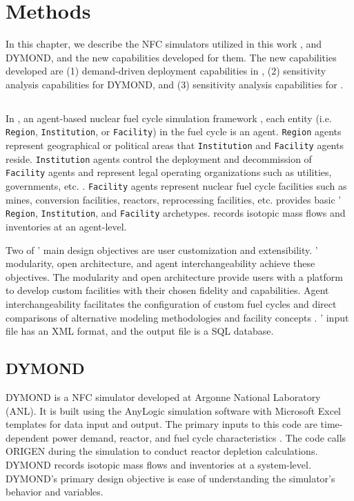 \chapter{Methods}
\label{chap:3}
In this chapter, we describe the \gls{NFC} simulators utilized in this work
, \Cyclus and DYMOND, and the new capabilities developed for them. 
The new capabilities developed are 
(1) demand-driven deployment capabilities in \Cyclus, 
(2) sensitivity analysis capabilities for DYMOND, and
(3) sensitivity analysis capabilities for \Cyclus. 

\section{\Cyclus}
In \Cyclus, an agent-based nuclear fuel cycle simulation framework 
\cite{huff_fundamental_2016}, 
each entity (i.e. \texttt{Region}, \texttt{Institution}, or \texttt{Facility}) in the 
fuel cycle is an agent. 
\texttt{Region} agents represent geographical or political areas 
that \texttt{Institution}
and \texttt{Facility} agents reside. 
\texttt{Institution} agents control the 
deployment and decommission of \texttt{Facility} agents 
and represent legal operating organizations such as
utilities, governments, etc. \cite{huff_fundamental_2016}.
\texttt{Facility} agents represent nuclear fuel cycle facilities
such as mines, conversion facilities, reactors, reprocessing facilities, 
etc. 
\Cycamore \cite{carlsen_cycamore_2014}
provides basic \Cyclus' \texttt{Region}, \texttt{Institution}, 
and \texttt{Facility} archetypes. 
\Cyclus records isotopic mass flows and inventories at an agent-level. 

Two of \Cyclus' main design objectives are user customization and 
extensibility. 
\Cyclus' modularity, open architecture, and agent interchangeability 
achieve these objectives.
The modularity and open architecture provide users with a 
platform to develop custom facilities with their chosen fidelity 
and capabilities. 
Agent interchangeability facilitates the configuration of custom fuel 
cycles and direct comparisons of alternative modeling methodologies 
and facility concepts \cite{huff_fundamental_2016}. 
\Cyclus' input file has an XML format, and the output file is 
a SQL database. 

\section{DYMOND}
DYMOND \cite{yacout_modeling_2005} is a \gls{NFC} simulator developed 
at Argonne National Laboratory (\gls{ANL}). 
It is built using the AnyLogic simulation software with 
Microsoft Excel templates for data input and output. 
The primary inputs to this code are time-dependent power demand, 
reactor, and fuel cycle characteristics 
\cite{feng_standardized_2016}.   
The code calls ORIGEN \cite{bell_origen_1973} during the simulation 
to conduct reactor depletion calculations. 
DYMOND records isotopic mass flows and inventories
at a system-level.
DYMOND's primary design objective is ease of understanding the  
simulator's behavior and variables. 

